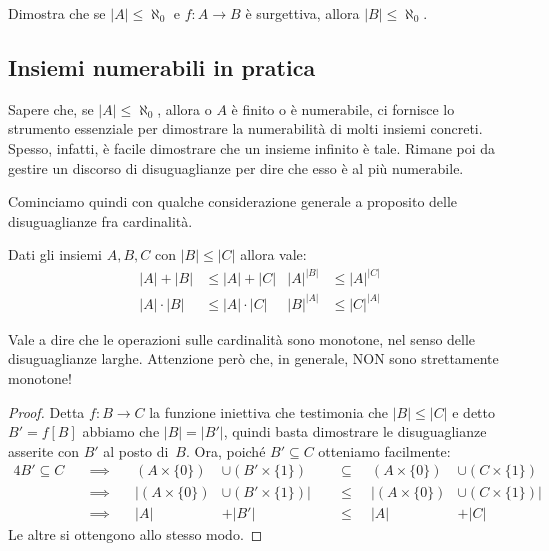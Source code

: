 \begin{exercise}
	\label{disuguaglianze_senza_AC2}
	Dimostra che se $|A| \leq \aleph_0$ e $f\colon A \to B$ \`e surgettiva, allora $|B| \leq \aleph_0$.
\end{exercise}

\subsection{Insiemi numerabili in pratica}
Sapere che, se $|A| \leq \aleph_0$, allora o $A$ \`e finito o \`e
numerabile, ci fornisce lo strumento essenziale per dimostrare la numerabilit\`a di molti insiemi concreti. Spesso, infatti,
\`e facile dimostrare che un insieme infinito \`e tale. Rimane poi da gestire un discorso di disuguaglianze per dire che esso \`e al pi\`u numerabile.

Cominciamo quindi con qualche considerazione generale a proposito delle disuguaglianze fra cardinalit\`a.

\begin{remark}
	\label{monot-op-card}
	Dati gli insiemi $A,B,C$ con $|B| \leq |C|$ allora vale:
	\begin{align*}
		|A| + |B| &\leq |A| + |C| & |A|^{|B|} &\leq |A|^{|C|} \\
		|A| \cdot |B| &\leq |A| \cdot |C| & |B|^{|A|} &\leq |C|^{|A|}
	\end{align*}
\end{remark}

Vale a dire che le operazioni sulle cardinalit\`a sono monotone, nel senso delle disuguaglianze larghe.
{\drkred Attenzione per\`o che, in generale, NON sono strettamente monotone!}

\begin{proof}
	Detta $f\colon B \to C$ la funzione iniettiva che testimonia che $|B| \leq |C|$ e detto $B' = f[B]$ abbiamo che $|B| = |B'|$,
	quindi basta dimostrare le disuguaglianze asserite con $B'$ al
posto di~$B$.
Ora, poich\'e $B' \subseteq C$ otteniamo facilmente:
	\begin{alignat*}{4}
		B' \subseteq C \quad&\implies\quad  & (A \times \{0\}) &\cup (B' \times \{1\})  &\;\;&\subseteq\;\; &  (A \times \{0\}) &\cup (C \times \{1\}) \\
				&\implies &|(A \times \{0\}) &\cup (B' \times \{1\})| &&\leq      & |(A \times \{0\}) &\cup (C \times \{1\})| \\
				&\implies & |A| &+ |B'| && \leq & |A| &+ |C|
	\end{alignat*}
	Le altre si ottengono allo stesso modo.
\end{proof}


